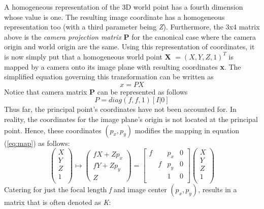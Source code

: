 \documentclass[12pt]{article}
\begin{document}
A homogeneous representation of the 3D world point has a fourth dimension whose value is one. The resulting image coordinate has a homogeneous representation too (with a third parameter being \textit{Z}). Furthermore, the 3x4 matrix above is the \textit{camera projection matrix} \textbf{P} for the canonical case where the camera origin and world origin are the same. Using this representation of coordinates, it is now simply put that a homogeneous world point \textbf{X} $= \left(X,Y,Z,1\right)^T$ is mapped by a camera onto its image plane with resulting coordinates \textbf{x}. The simplified equation governing this transformation can be written as
\begin{equation}
x = PX
\end{equation}
Notice that camera matrix \textbf{P} can be represented as follows
\begin{equation}
P = diag(f,f,1)[I | 0] \label{cameraP}
\end{equation}
Thus far, the principal point's coordinates have not been accounted for. In reality, the coordinates for the image plane's origin is not located at the principal point. Hence, these coordinates $(\textit{p}_x,\textit{p}_y)$ modifies the mapping in equation (\ref{eq:map}) as follows:  
\begin{equation}
\left( \begin{array}{c} X \\ Y \\ Z \\ 1 \\ \end{array} \right) \mapsto \left( \begin{array}{c} \textit{f}X + Zp_x \\
\textit{f}Y  + Zp_y \\
Z \end{array} \right) = 
\left[ {\begin{array}{cccc}
f & & p_x & 0 \\
& f & p_y & 0 \\
& & 1 & 0\\
\end{array} }\right] \left( \begin{array}{c} X \\ Y \\ Z \\ 1 \\ \end{array} \right)
\end{equation}
Catering for just the focal length \textit{f} and image center  $(\textit{p}_x,\textit{p}_y)$, results in a matrix that is often denoted as \textit{K}:
\end{document}
